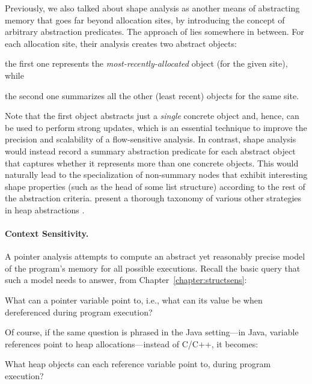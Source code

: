 Previously, we also talked about shape analysis
\cite{toplas/SagivRW02,popl/SagivRW99,toplas/SagivRW98} as another
means of abstracting memory that goes far beyond allocation sites, by
introducing the concept of arbitrary abstraction predicates. The
approach of \citeauthor{sas/BalakrishnanR06}
\cite{sas/BalakrishnanR06} lies somewhere in between. For each
allocation site, their analysis creates two abstract objects:
\begin{inparaenum}[(i)]
\item the first one represents the \emph{most-recently-allocated}
  object (for the given site), while
\item the second one summarizes all the other (least recent)
  objects for the same site.
\end{inparaenum}
Note that the first object abstracts just a \emph{single} concrete
object and, hence, can be used to perform strong updates, which is an
essential technique to improve the precision and scalability of a
flow-sensitive analysis.
%
In contrast, shape analysis would instead record a summary abstraction
predicate for each abstract object that captures whether it represents
more than one concrete objects. This would naturally lead to the
specialization of non-summary nodes that exhibit interesting shape
properties (such as the head of some list structure) according to the
rest of the abstraction criteria.
%
\citeauthor{journals/corr/KanvarK14} present a thorough taxonomy of
various other strategies in heap abstractions
\cite{journals/corr/KanvarK14}.



\paragraph{Context Sensitivity.}

A pointer analysis attempts to compute an abstract yet reasonably
precise model of the program's memory for all possible
executions. Recall the basic query that such a model needs to answer,
from Chapter~\ref{chapter:structsens}:
\begin{displayquote}
  What can a pointer variable point to, i.e., what can its value be
  when dereferenced during program execution?
\end{displayquote}
Of course, if the same question is phrased in the Java setting---in
Java, variable references point to heap allocations---instead of
C/C++, it becomes:
\begin{displayquote}
  What heap objects can each reference variable point to, during
  program execution?
\end{displayquote}


